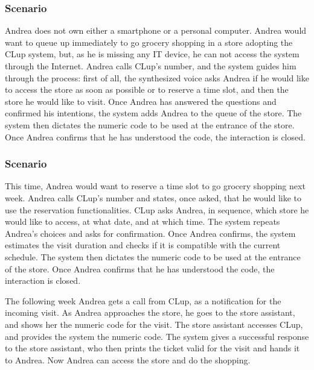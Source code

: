 \documentclass[../../main.tex]{subfiles}
\begin{document}
\subsubsection{Scenario }

  Andrea does not own either a smartphone or a personal computer. 
  Andrea would want to queue up immediately to go grocery shopping in a store adopting the CLup system, 
  but, as he is missing any IT device, he can not access the system through the Internet. 
  Andrea calls CLup's number, and the system guides him through the process: first of all, 
  the synthesized voice asks Andrea if he would like to access the store as soon as possible or to reserve a time slot, 
  and then the store he would like to visit. Once Andrea has answered the questions and confirmed his intentions, 
  the system adds Andrea to the queue of the store. The system then dictates the numeric code to be used at the entrance of the store. 
  Once Andrea confirms that he has understood the code, the interaction is closed.



\subsubsection{Scenario }

  This time, Andrea would want to reserve a time slot to go grocery shopping next week. 
  Andrea calls CLup's number and states, once asked, that he would like to use the reservation functionalities. 
  CLup asks Andrea, in sequence, which store he would like to access, at what date, and at which time. 
  The system repeats Andrea's choices and asks for confirmation. Once Andrea confirms, 
  the system estimates the visit duration and checks if it is compatible with the current schedule. 
  The system then dictates the numeric code to be used at the entrance of the store. 
  Once Andrea confirms that he has understood the code, the interaction is closed.

  The following week Andrea gets a call from CLup, as a notification for the incoming visit. 
  As Andrea approaches the store, he goes to the store assistant, and shows her the numeric code 
  for the visit.
  The store assistant accesses CLup, and provides the system the numeric code. 
  The system gives a successful response to the store assistant, who then prints the ticket valid 
  for the visit and hands it to Andrea. 
  Now Andrea can access the store and do the shopping.
\end{document}
